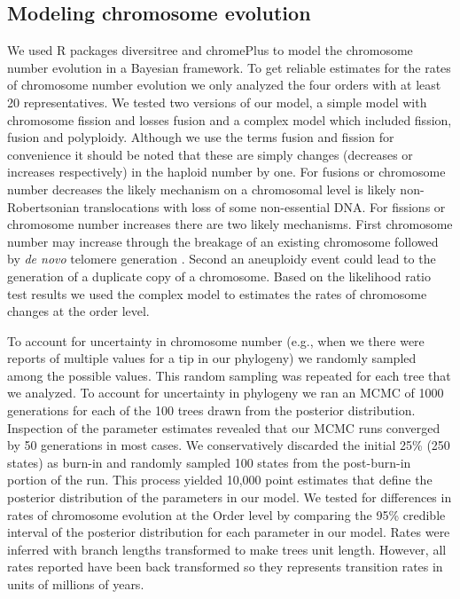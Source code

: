 \subsection{Modeling chromosome evolution}
We used R packages diversitree \citep{fitzjohn2012} and chromePlus \citep{blackmon2019meiotic} to model the chromosome number evolution in a Bayesian framework.
To get reliable estimates for the rates of chromosome number evolution we only analyzed the four orders with at least 20 representatives.
We tested two versions of our model, a simple model with chromosome fission and losses fusion and a complex model which included fission, fusion and polyploidy.
Although we use the terms fusion and fission for convenience it should be noted that these are simply changes (decreases or increases respectively) in the haploid number by one.
For fusions or chromosome number decreases the likely mechanism on a chromosomal level is likely non-Robertsonian translocations with loss of some non-essential DNA.
For fissions or chromosome number increases there are two likely mechanisms.
First chromosome number may increase through the breakage of an existing chromosome followed by \textit{de novo} telomere generation \citep{harrington1991, tsujimoto1999}.
Second an aneuploidy event could lead to the generation of a duplicate copy of a chromosome.
Based on the likelihood ratio test results we used the complex model to estimates the rates of chromosome changes at the order level.

To account for uncertainty in chromosome number (e.g., when we there were reports of multiple values for a tip in our phylogeny) we randomly sampled among the possible values.
This random sampling was repeated for each tree that we analyzed.
To account for uncertainty in phylogeny we ran an MCMC of 1000 generations for each of the 100 trees drawn from the posterior distribution.
Inspection of the parameter estimates revealed that our MCMC runs converged by 50 generations in most cases.  
We conservatively discarded the initial 25\% (250 states) as burn-in and randomly sampled 100 states from the post-burn-in portion of the run. 
This process yielded 10,000 point estimates that define the posterior distribution of the parameters in our model.
We tested for differences in rates of chromosome evolution at the Order level by comparing the 95\% credible interval of the posterior distribution for each parameter in our model.
Rates were inferred with branch lengths transformed to make trees unit length.
However, all rates reported have been back transformed so they represents transition rates in units of millions of years.

